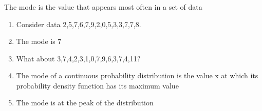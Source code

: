 \documentclass[t, 11pt]{beamer}
\begin{document}
\begin{frame} 
	\frametitle{\insertsection} 
	\framesubtitle{\insertsubsection}
	
	The mode is the value that appears most often in a set of data
	\begin{enumerate}
	\item Consider data 2,5,7,6,7,9,2,0,5,3,3,7,7,8.
	\item The mode is 7
	\item What about 3,7,4,2,3,1,0,7,9,6,3,7,4,11?
	\item The mode of a continuous probability distribution is the value x at which its probability density function has its maximum value
	\item The mode is at the peak of the distribution
	\end{enumerate}
	
\end{frame}	

\end{document}
